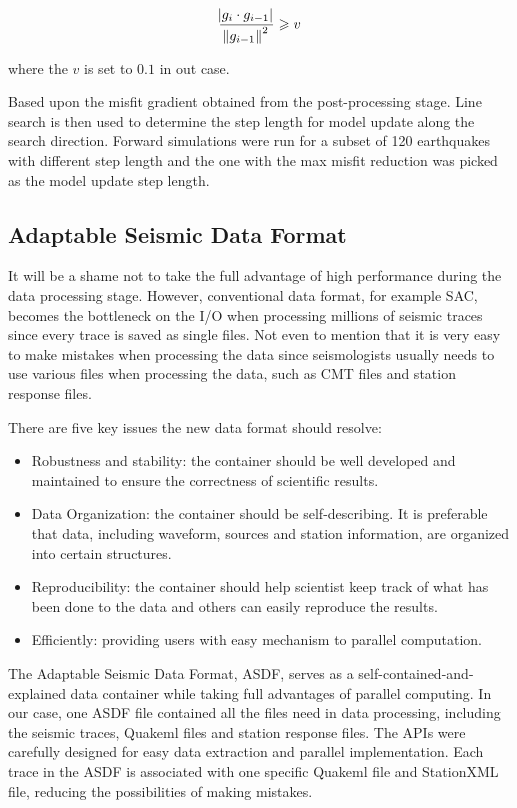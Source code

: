 \documentclass[extra,mreferee]{gji}
\begin{document}
\begin{equation}
  \frac { \abs{g_i \cdot g_{i-1}} }  {\norm{g_{i-1}}^2} \geqslant v
\end{equation}

where the $v$ is set to $0.1$ in out case.

Based upon the misfit gradient obtained from the post-processing stage.
Line search is then used to determine the step length for model update
along the search direction. Forward simulations were run for a subset
of 120 earthquakes with different step length and the one with
the max misfit reduction was picked as the model update step length.

\subsection{Adaptable Seismic Data Format}

It will be a shame not to take the full advantage of high performance during the data processing stage. However, conventional data format, for example SAC, becomes the bottleneck on the I/O when processing millions of seismic traces since every trace is saved as single files. Not even to mention that it is very easy to make mistakes when processing the data since seismologists usually needs to use various files when processing the data, such as CMT files and station response files.

There are five key issues the new data format should resolve:
\begin{itemize}
    \item Robustness and stability: the container should be well developed and maintained to ensure the correctness of scientific results.
    \item Data Organization: the container should be self-describing. It is preferable that data, including waveform, sources and station information, are organized into certain structures.
    \item Reproducibility: the container should help scientist keep track of what has been done to the data and others can easily reproduce the results.
    \item Efficiently: providing users with easy mechanism to parallel computation.

\end{itemize}

The Adaptable Seismic Data Format, ASDF, serves as a self-contained-and-explained data container while taking full advantages of parallel computing. In our case, one ASDF file contained all the files need in data processing, including the seismic traces, Quakeml files and station response files. The APIs were carefully designed for easy data extraction and parallel implementation. Each trace in the ASDF is associated with one specific Quakeml file and StationXML file, reducing the possibilities of making mistakes.
\end{document}
